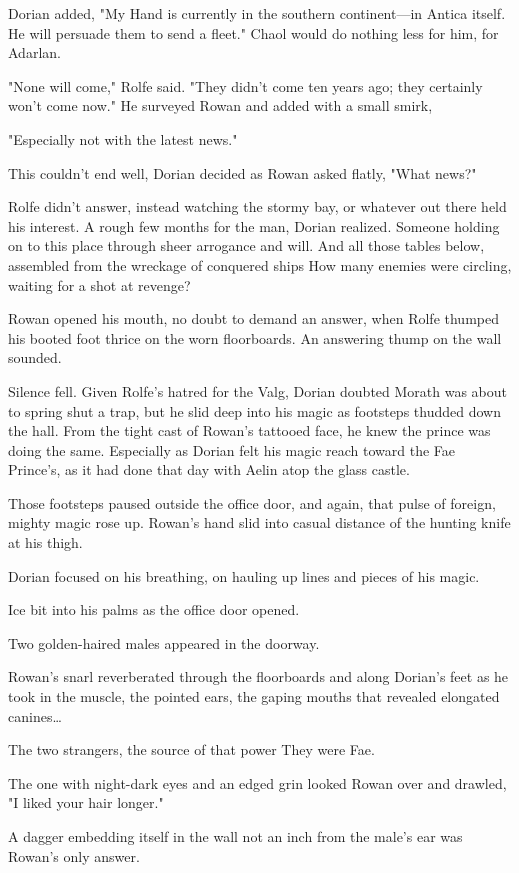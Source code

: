Dorian added, "My Hand is currently in the southern continent---in Antica itself. He will persuade them to send a fleet." Chaol would do nothing less for him, for Adarlan.

"None will come," Rolfe said. "They didn't come ten years ago; they certainly won't come now." He surveyed Rowan and added with a small smirk,

"Especially not with the latest news."

This couldn't end well, Dorian decided as Rowan asked flatly, "What news?"

Rolfe didn't answer, instead watching the stormy bay, or whatever out there held his interest. A rough few months for the man, Dorian realized. Someone holding on to this place through sheer arrogance and will. And all those tables below, assembled from the wreckage of conquered ships  How many enemies were circling, waiting for a shot at revenge?

Rowan opened his mouth, no doubt to demand an answer, when Rolfe thumped his booted foot thrice on the worn floorboards. An answering thump on the wall sounded.

Silence fell. Given Rolfe's hatred for the Valg, Dorian doubted Morath was about to spring shut a trap, but  he slid deep into his magic as footsteps thudded down the hall. From the tight cast of Rowan's tattooed face, he knew the prince was doing the same. Especially as Dorian felt his magic reach toward the Fae Prince's, as it had done that day with Aelin atop the glass castle.

Those footsteps paused outside the office door, and again, that pulse of foreign, mighty magic rose up. Rowan's hand slid into casual distance of the hunting knife at his thigh.

Dorian focused on his breathing, on hauling up lines and pieces of his magic.

Ice bit into his palms as the office door opened.

Two golden-haired males appeared in the doorway.

Rowan's snarl reverberated through the floorboards and along Dorian's feet as he took in the muscle, the pointed ears, the gaping mouths that revealed elongated canines\ldots{}

The two strangers, the source of that power  They were Fae.

The one with night-dark eyes and an edged grin looked Rowan over and drawled, "I liked your hair longer."

A dagger embedding itself in the wall not an inch from the male's ear was Rowan's only answer.
